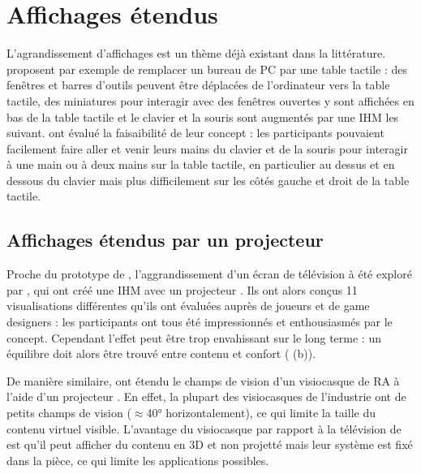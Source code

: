\section{Affichages étendus}
L'agrandissement d'affichages est un thème déjà existant dans la littérature. \cite{Bi2011} proposent par exemple de remplacer un bureau de PC par une table tactile  : des fenêtres et barres d'outils peuvent être déplacées de l'ordinateur vers la table tactile, des miniatures pour interagir avec des fenêtres ouvertes y sont affichées en bas de la table tactile et le clavier et la souris sont augmentés par une IHM les suivant. \citeauthor{Bi2011} ont évalué la faisaibilité de leur concept : les participants pouvaient facilement faire aller et venir leurs mains du clavier et de la souris pour interagir à une main ou à deux mains sur la table tactile, en particulier au dessus et en dessous du clavier mais plus difficilement sur les côtés gauche et droit de la table tactile.


\subsection{Affichages étendus par un projecteur}
Proche du prototype de \cite{Baudisch2002}, l'aggrandissement d'un écran de télévision à été exploré par \cite{Jones2013}, qui ont créé une IHM  avec un projecteur . Ils ont alors conçus 11 visualisations différentes qu'ils ont évaluées auprès de joueurs et de game designers : les participants ont tous été impressionnés et enthousiasmés par le concept. Cependant l'effet peut être trop envahissant sur le long terme : un équilibre doit alors être trouvé entre contenu et confort ( (b)). 

De manière similaire, \cite{Benko2015} ont étendu le champs de vision d'un visiocasque de RA à l'aide d'un projecteur . En effet, la plupart des visiocasques de l'industrie ont de petits champs de vision ($\approx$\ang{40} horizontalement), ce qui limite la taille du contenu virtuel visible. L'avantage du visiocasque par rapport à la télévision de \cite{Jones2013} est qu'il peut afficher du contenu en 3D et non projetté mais leur système est fixé dans la pièce, ce qui limite les applications possibles.

